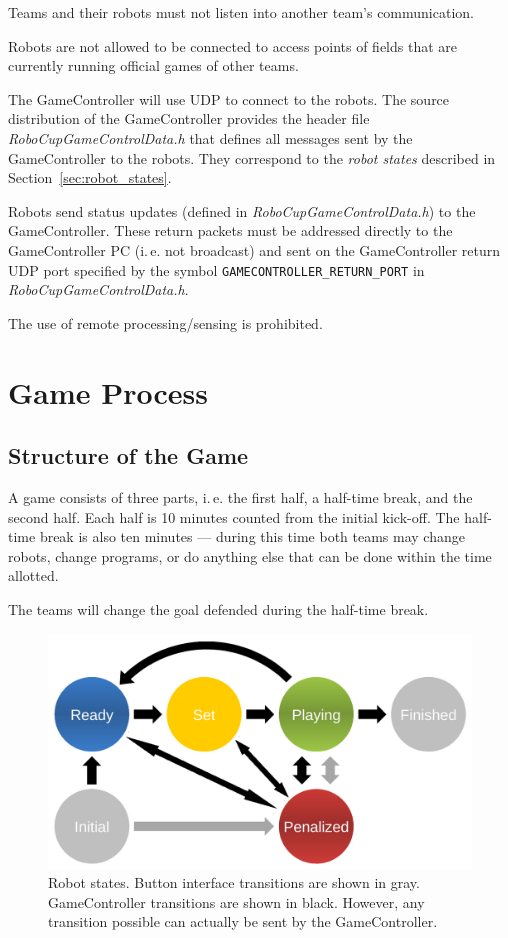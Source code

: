 \documentclass[12pt]{article}
\newcommand{\ie}{\mbox{i.\,e.}\xspace}
\begin{document}
Teams and their robots must not listen into another team's communication.

Robots are not allowed to be connected to access points of fields that are currently running official games of other teams.

The GameController will use UDP to connect to the robots. The source distribution of the GameController provides the header file \emph{RoboCupGameControlData.h} that defines all messages sent by the GameController to the robots. They correspond to the \emph{robot states} described in Section~\ref{sec:robot_states}.

Robots send status updates (defined in \emph{RoboCupGameControlData.h}) to the GameController. These return packets must be addressed directly to the GameController PC (\ie not broadcast) and sent on the GameController return UDP port specified by the symbol \verb!GAMECONTROLLER_RETURN_PORT! in \emph{RoboCupGameControlData.h}.

The use of remote processing/sensing is prohibited.


\newpage


\section{Game Process}
\label{sec:game_process}

\subsection{Structure of the Game}
\label{sec:game_struct}

A game consists of three parts, \ie the first half, a half-time break, and the second half. Each half is 10 minutes counted from the initial kick-off. The half-time break is also ten minutes --- during this time both teams may change robots, change programs, or do anything else that can be done within the time allotted. 

The teams will change the goal defended during the half-time break.

\begin{figure}[t]
\centerline{\includegraphics[width=0.9\columnwidth]{figs/states.pdf}}
\caption{Robot states. Button interface transitions are shown in gray. GameController transitions are shown in black. However, any transition possible can actually be sent by the GameController.}
\label{fig:robot_states}
\end{figure}
\end{document}

